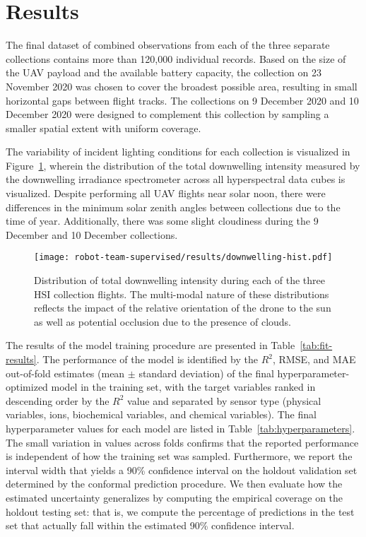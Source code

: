 \section{Results}


The final dataset of combined observations from each of the three separate collections contains more than 120,000 individual records. Based on the size of the UAV payload and the available battery capacity, the collection on 23 November 2020 was chosen to cover the broadest possible area, resulting in small horizontal gaps between flight tracks. The collections on 9 December 2020 and 10 December 2020 were designed to complement this collection by sampling a smaller spatial extent with uniform coverage.

The variability of incident lighting conditions for each collection is visualized in Figure~\ref{fig:downwelling-hist}, wherein the distribution of the total downwelling intensity measured by the downwelling irradiance spectrometer across all hyperspectral data cubes is visualized. Despite performing all UAV flights near solar noon, there were differences in the minimum solar zenith angles between collections due to the time of year. Additionally, there was some slight cloudiness during the 9 December and 10 December collections. 

\begin{figure}[H]
  \centering
  \texttt{[image: robot-team-supervised/results/downwelling-hist.pdf]}
  \caption{Distribution of total downwelling intensity during each of the three
    HSI collection flights. The multi-modal nature of these distributions
    reflects the impact of the relative orientation of the drone to the sun as
    well as potential occlusion due to the presence of
    clouds.\label{fig:downwelling-hist}}
\end{figure}   

The results of the model training procedure are presented in Table~\ref{tab:fit-results}. The performance of the model is identified by the $R^2$, RMSE, and MAE out-of-fold estimates (mean $\pm$ standard deviation) of the final hyperparameter-optimized model in the training set, with the target variables ranked in descending order by the $R^2$ value and separated by sensor type (physical variables, ions, biochemical variables, and chemical variables). The final hyperparameter values for each model are listed in Table~\ref{tab:hyperparameters}. The small variation in values across folds confirms that the reported performance is independent of how the training set was sampled. Furthermore, we report the interval width that yields a 90\% confidence interval on the holdout validation set determined by the conformal prediction procedure. We then evaluate how the estimated uncertainty generalizes by computing the empirical coverage on the holdout testing set: that is, we compute the percentage of predictions in the test set that actually fall within the estimated 90\% confidence interval.


